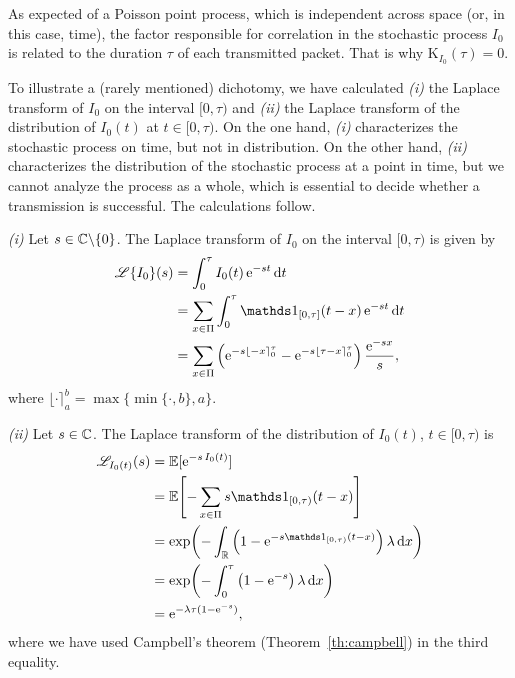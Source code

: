 As expected of a Poisson point process, which is independent across space (or, in this case, time), the factor responsible for correlation in the stochastic process $I_0$ is related to the duration $\tau$ of each transmitted packet. That is why $\mathrm{K}_{I_0}(\tau) = 0$.

\begin{remark} \label{remark:Ch5_I0}
    To illustrate a (rarely mentioned) dichotomy, we have calculated \textit{(i)} the Laplace transform of $I_0$ on the interval $[0,\tau)$ and \textit{(ii)} the Laplace transform of the distribution of $I_0(t)$ at $t\in[0,\tau)$.
    On the one hand, \textit{(i)} characterizes the stochastic process on time, but not in distribution.
    On the other hand, \textit{(ii)} characterizes the distribution of the stochastic process at a point in time, but we cannot analyze the process as a whole, which is essential to decide whether a transmission is successful.
    The calculations follow.
    
    \textit{(i)} Let $s\in{\mathbb C}\backslash\{0\}$. The Laplace transform of $I_0$ on the interval $[0,\tau)$ is given by
    \begin{align}
        \mathscr{L}\{I_0\}(s)
            &= \int_0^\tau I_0(t)\,\euler^{-s t}\,\d t \nonumber\\
            &= \sum_{x\in\Pi} \int_0^\tau \ind_{[0,\tau]}(t-x)\,\euler^{-s t}\,\d t\nonumber\\
            &= \sum_{x\in\Pi} \left(\euler^{-s \lfloor -x\rceil_0^\tau} - \euler^{-s \lfloor \tau-x \rceil_0^\tau} \right)\frac{\euler^{-s x}}{s}, \label{eq:Ch5_LT_I0}
    \end{align}
    where $\lfloor \cdot\rceil_a^b = \max\{\min\{\cdot,b\},a\}$.
    
    \textit{(ii)} Let $s\in{\mathbb C}$. The Laplace transform of the distribution of $I_0(t)$, $t\in[0,\tau)$ is
    \begin{align*}
        \mathscr{L}_{I_0(t)}(s) &= \E[\euler^{-s\,I_0(t)}]\\
            &= \E\!\left[-\sum_{x\in\Pi} s\ind_{[0,\tau)}(t-x) \right]\\
            &= \exp\!\left(-\int_\R \left(1 - \euler^{-s\ind_{[0,\tau)}(t-x)}\right)\lambda\,\d x \right)\\
            &= \exp\!\left(-\int_0^\tau \left(1 - \euler^{-s}\right)\lambda\,\d x \right)\\
            &= \euler^{-\lambda\tau(1-\euler^{-s})},
    \end{align*}
    where we have used Campbell's theorem (Theorem~\ref{th:campbell}) in the third equality.
    

\end{remark}
